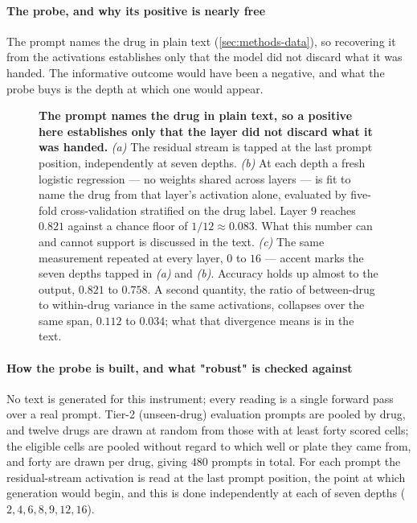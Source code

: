 \paragraph{The probe, and why its positive is nearly free} The prompt names the
drug in plain text (\cref{sec:methods-data}), so recovering it from the
activations establishes only that the model did not discard what it was handed.
The informative outcome would have been a negative, and what the probe buys is
the depth at which one would appear.

\begin{figure}[htbp]
\begin{fullwidth}
\centering

\caption[Reading the drug out of a layer]{\textbf{The prompt names the drug in
plain text, so a positive here establishes only that the layer did not discard
what it was handed.} \emph{(a)} The residual stream is tapped at the last
prompt position, independently at seven depths. \emph{(b)} At each depth a
fresh logistic regression --- no weights shared across layers --- is fit to
name the drug from that layer's activation alone, evaluated by five-fold
cross-validation stratified on the drug label. Layer 9 reaches $0.821$ against
a chance floor of $1/12 \approx 0.083$. What this number can and cannot support
is discussed in the text. \emph{(c)} The same measurement repeated at every
layer, $0$ to $16$ --- accent marks the seven depths tapped in \emph{(a)} and
\emph{(b)}. Accuracy holds up almost to the output, $0.821$ to $0.758$. A
second quantity, the ratio of between-drug to within-drug variance in the same
activations, collapses over the same span, $0.112$ to $0.034$; what that
divergence means is in the text.}
\label{fig:licensing}
\end{fullwidth}
\end{figure}

\paragraph{How the probe is built, and what "robust" is checked against} No text
is generated for this instrument; every reading is a single forward pass over a
real prompt. Tier-2 (unseen-drug) evaluation prompts are pooled by drug, and
twelve drugs are drawn at random from those with at least forty scored cells;
the eligible cells are pooled without regard to which well or plate they came
from, and forty are drawn per drug, giving $480$ prompts in total. For each
prompt the residual-stream activation is read at the last prompt position, the
point at which generation would begin, and this is done independently at each of
seven depths ($2,4,6,8,9,12,16$).

